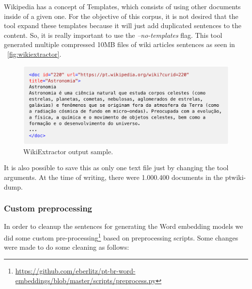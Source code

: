 Wikipedia has a concept of Templates, which consists of using other documents inside of a given one. For the objective of this corpus, it is not desired that the tool expand these templates because it will just add duplicated sentences to the content. So, it is really important to use the \textit{–no-templates} flag.
This tool generated multiple compressed 10MB files of wiki articles sentences as seen in ~\autoref{fig:wikiextractor}.

\begin{figure}[h]
    \caption{WikiExtractor output sample.}
    \label{fig:wikiextractor}
    \centering%
    \begin{minipage}{.9\textwidth}
        \includegraphics[width=\textwidth]{wikiextractor.png}
    \end{minipage}
\end{figure}

It is also possible to save this as only one text file just by changing the tool arguments.
At the time of writing, there were 1.000.400 documents in the ptwiki-dump.

\subsubsection{Custom preprocessing}

In order to cleanup the sentences for generating the Word embedding models we did some custom pre-processing\footnote{\url{https://github.com/eberlitz/pt-br-word-embeddings/blob/master/scripts/preprocess.py}} based on  preprocessing scripts. Some changes were made to do some cleaning as follows:

